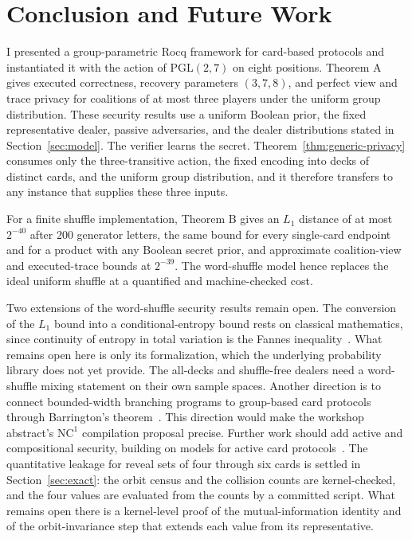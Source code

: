 \documentclass[runningheads]{llncs}
\newcommand{\Rocq}{Rocq}
\newcommand{\PG}{\mathrm{PGL}(2,7)}
\begin{document}
\section{Conclusion and Future Work}\label{sec:conclusion}

I presented a group-parametric \Rocq{} framework for card-based protocols
and instantiated it with the action of $\PG$ on eight positions. Theorem A
gives executed correctness, recovery parameters $(3,7,8)$, and perfect view
and trace privacy for coalitions of at most three players under the uniform
group distribution. These security results use a uniform Boolean prior, the
fixed representative dealer, passive adversaries, and the dealer
distributions stated in Section~\ref{sec:model}. The verifier learns the
secret. Theorem~\ref{thm:generic-privacy} consumes only the
three-transitive action, the fixed encoding into decks of distinct
cards, and the uniform group distribution, and it therefore transfers to
any instance that supplies these three inputs.

For a finite shuffle implementation, Theorem B gives an $L_1$
distance of at most $2^{-40}$ after 200 generator letters, the same bound
for every single-card endpoint and for a product with any Boolean secret
prior, and approximate coalition-view and executed-trace bounds at
$2^{-39}$. The word-shuffle model hence replaces the ideal uniform
shuffle at a quantified and machine-checked cost.

Two extensions of the word-shuffle security results remain open. The
conversion of the $L_1$ bound into a conditional-entropy bound rests on
classical mathematics, since continuity of entropy in total variation is
the Fannes inequality~\cite{Fannes1973,CsiszarKorner2011}. What remains
open here is only its formalization, which the underlying probability
library does not yet provide. The all-decks and shuffle-free dealers need
a word-shuffle mixing statement on their own sample spaces. Another
direction is to connect
bounded-width branching programs to group-based card protocols through
Barrington's theorem~\cite{Barrington1989,DvorakKoucky2021}. This direction
would make the workshop abstract's $\mathrm{NC}^1$ compilation proposal
precise. Further work should add active and compositional security, building
on models for active card protocols~\cite{KochFUN2021}.
The quantitative leakage for reveal sets of four through six cards is
settled in Section~\ref{sec:exact}: the orbit census and the collision
counts are kernel-checked, and the four values are evaluated from the
counts by a committed script. What remains open there is a kernel-level
proof of the mutual-information identity and of the orbit-invariance step
that extends each value from its representative.
\end{document}
